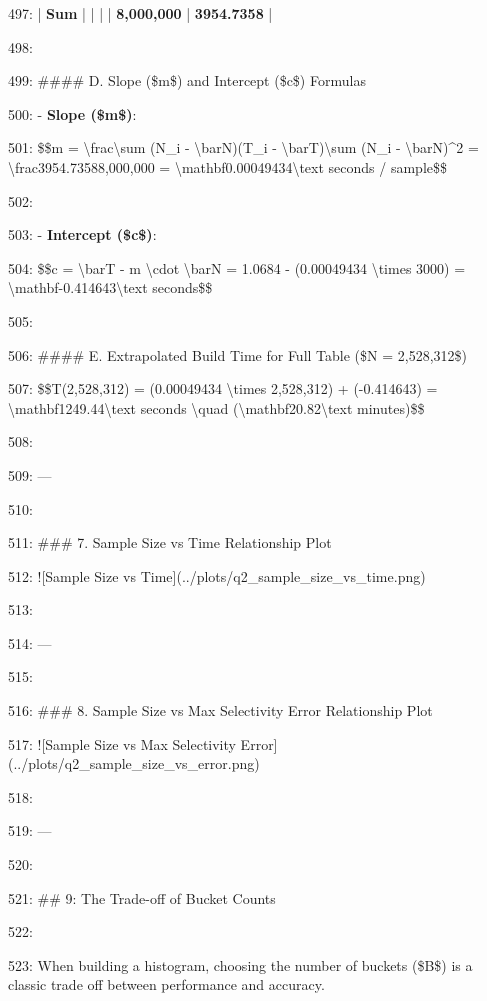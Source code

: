 \documentclass[11pt,a4paper]{article}
\begin{document}
497: | \textbf{Sum} | | | | \textbf{8,000,000} | \textbf{3954.7358} |

498:

499: \#\#\#\# D. Slope (\$m\$) and Intercept (\$c\$) Formulas

500: - \textbf{Slope (\$m\$)}:

501:   \$\$m = \textbackslash{}frac{\textbackslash{}sum (N\_i - \textbackslash{}bar{N})(T\_i - \textbackslash{}bar{T})}{\textbackslash{}sum (N\_i - \textbackslash{}bar{N})\textasciicircum{}2} = \textbackslash{}frac{3954.7358}{8,000,000} = \textbackslash{}mathbf{0.00049434\textbackslash{}text{ seconds / sample}}\$\$

502:

503: - \textbf{Intercept (\$c\$)}:

504:   \$\$c = \textbackslash{}bar{T} - m \textbackslash{}cdot \textbackslash{}bar{N} = 1.0684 - (0.00049434 \textbackslash{}times 3000) = \textbackslash{}mathbf{-0.414643\textbackslash{}text{ seconds}}\$\$

505:

506: \#\#\#\# E. Extrapolated Build Time for Full Table (\$N = 2,528,312\$)

507: \$\$T(2,528,312) = (0.00049434 \textbackslash{}times 2,528,312) + (-0.414643) = \textbackslash{}mathbf{1249.44\textbackslash{}text{ seconds}} \textbackslash{}quad (\textbackslash{}mathbf{20.82\textbackslash{}text{ minutes}})\$\$

508:

509: ---

510:

511: \#\#\# 7. Sample Size vs Time Relationship Plot

512: ![Sample Size vs Time](../plots/q2\_sample\_size\_vs\_time.png)

513:

514: ---

515:

516: \#\#\# 8. Sample Size vs Max Selectivity Error Relationship Plot

517: ![Sample Size vs Max Selectivity Error](../plots/q2\_sample\_size\_vs\_error.png)

518:

519: ---

520:

521: \#\# 9: The Trade-off of Bucket Counts

522:

523: When building a histogram, choosing the number of buckets (\$B\$) is a classic trade off between performance and accuracy.
\end{document}
